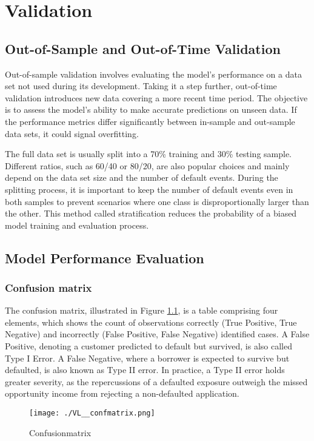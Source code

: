 \chapter{Validation}
\label{ch:VL}

\section{Out-of-Sample and Out-of-Time Validation}
Out-of-sample validation involves evaluating the model's performance on a data set not used during its development. Taking it a step further, out-of-time validation introduces new data covering a more recent time period. The objective is to assess the model's ability to make accurate predictions on unseen data. If the performance metrics differ significantly between in-sample and out-sample data sets, it could signal overfitting. 

The full data set is usually split into a 70\% training and 30\% testing sample. Different ratios, such as 60/40 or 80/20, are also popular choices and mainly depend on the data set size and the number of default events. During the splitting process, it is important to keep the number of default events even in both samples to prevent scenarios where one class is disproportionally larger than the other. This method called stratification reduces the probability of a biased model training and evaluation process.

\section{Model Performance Evaluation}

\subsection{Confusion matrix}
The confusion matrix, illustrated in Figure \ref{fig:vl_confmatr}, is a table comprising four elements, which shows the count of observations correctly (True Positive, True Negative) and incorrectly (False Positive, False Negative) identified cases. A False Positive, denoting a customer predicted to default but survived, is also called Type I Error. A False Negative, where a borrower is expected to survive but defaulted, is also known as Type II error. In practice, a Type II error holds greater severity, as the repercussions of a defaulted exposure outweigh the missed opportunity income from rejecting a non-defaulted application.

\begin{figure}[H]
	\centering
	\texttt{[image: ./VL\_\_confmatrix.png]}
    \caption{Confusionmatrix}
    \label{fig:vl_confmatr}
\end{figure}

